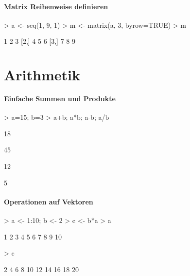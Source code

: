 \paragraph{Matrix Reihenweise definieren}
\begin{Schunk}
\begin{Sinput}
> a <- seq(1, 9, 1)
> m <- matrix(a, 3, byrow=TRUE)
> m
\end{Sinput}
\begin{Soutput}
     [,1] [,2] [,3]
[1,]    1    2    3
[2,]    4    5    6
[3,]    7    8    9
\end{Soutput}
\end{Schunk}

\section{Arithmetik}
\paragraph{Einfache Summen und Produkte}
\begin{Schunk}
\begin{Sinput}
> a=15; b=3
> a+b; a*b; a-b; a/b
\end{Sinput}
\begin{Soutput}
[1] 18
\end{Soutput}
\begin{Soutput}
[1] 45
\end{Soutput}
\begin{Soutput}
[1] 12
\end{Soutput}
\begin{Soutput}
[1] 5
\end{Soutput}
\end{Schunk}

\paragraph{Operationen auf Vektoren}
\begin{Schunk}
\begin{Sinput}
> a <- 1:10; b <- 2
> c <- b*a
> a
\end{Sinput}
\begin{Soutput}
 [1]  1  2  3  4  5  6  7  8  9 10
\end{Soutput}
\begin{Sinput}
> c
\end{Sinput}
\begin{Soutput}
 [1]  2  4  6  8 10 12 14 16 18 20
\end{Soutput}
\end{Schunk}

